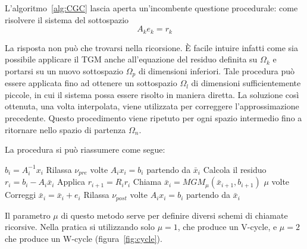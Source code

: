 
L'algoritmo~\vref{alg:CGC} lascia aperta un'incombente questione procedurale: come risolvere il sistema del sottospazio
\begin{equation}
A_ke_k = r_k
\end{equation}

La risposta non può che trovarsi nella ricorsione. È facile intuire infatti come sia possibile applicare il TGM anche all'equazione del residuo definita su $\Omega_k$ e portarsi su un nuovo sottospazio $\Omega_p$ di dimensioni inferiori.
Tale procedura può essere applicata fino ad ottenere un sottospazio $\Omega_l$ di dimensioni sufficientemente piccole, in cui il sistema possa essere risolto in maniera diretta. La soluzione così ottenuta, una volta interpolata, viene utilizzata per correggere l'approssimazione precedente. Questo procedimento viene ripetuto per ogni spazio intermedio fino a ritornare nello spazio di partenza $\Omega_n$.

La procedura si può riassumere come segue:
\begin{algorithm}
\caption{$\bar{x}_n = MGM\mu(\bar{x}_i, b_i)$}
\label{alg:MGM}
\begin{algorithmic}[1]
	\State $b_i = A_i^{-1}x_i$
\Else
	\State Rilassa $\nu_{pre}$ volte $A_ix_i =b_i$ partendo da $\bar{x}_i$
	\State Calcola il residuo $r_i = b_i - A_i \bar{x}_i$
	\State Applica $r_{i+1} = R_i r_i$
	\State Chiama $\bar{x}_i = MGM_{\mu}(\bar{x}_{i+1},b_{i+1})$ $\mu$ volte
	\State Correggi $\bar{x}_i = \bar{x}_i + e_i$
	\State Rilassa $\nu_{post}$ volte $A_ix_i = b_i$ partendo da $\bar{x}_i$
\EndIf
\end{algorithmic}
\end{algorithm}

Il parametro $\mu$ di questo metodo serve per definire diversi schemi di chiamate ricorsive. Nella pratica si utilizzando solo $\mu = 1$, che produce un V-cycle, e $\mu = 2$ che produce un W-cycle (figura~\vref{fig:cycle}).




